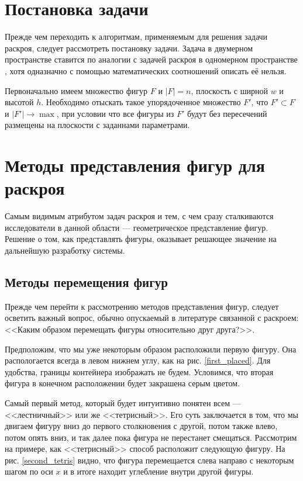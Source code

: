 \documentclass[14pt]{extarticle}
\begin{document}
	\section{Постановка задачи}
	Прежде чем переходить к алгоритмам, применяемым для решения задачи раскроя, следует рассмотреть постановку задачи. Задача в двумерном пространстве ставится по аналогии с задачей раскроя в одномерном пространстве \cite{Nikitenkov}, хотя одназначно с помощью математических соотношений описать её нельзя.
	
	Первоначально имеем множество фигур $F$ и $|F|=n$, плоскость с ширной $w$ и высотой $h$. Необходимо отыскать такое упорядоченное множество $F'$, что $F'\subset F$ и $|F'|\to \max$, при условии что все фигуры из $F'$ будут без пересечений размещены на плоскости с заданнами параметрами. 

	\section{Методы представления фигур для раскроя}
	Самым видимым атрибутом задач раскроя и тем, с чем сразу сталкиваются исследователи в данной области --- геометрическое представление фигур. Решение о том, 	как представлять фигуры, оказывает решающее значение на дальнейшую разработку системы.
	\subsection{Методы перемещения фигур}
	Прежде чем перейти к рассмотрению методов представления фигур, следует осветить важный вопрос, обычно опускаемый в литературе связанной с раскроем: <<Каким 	образом перемещать фигуры относительно друг друга?>>.


	Предположим, что мы уже некоторым образом расположили первую фигуру. Она распологается всегда в левом нижнем углу, как на рис. \ref{first_placed}. Для удобства, границы контейнера изображать не будем. Условимся, что вторая фигура в конечном расположении будет закрашена серым цветом.
	


	Самый первый метод, который будет интуитивно понятен всем --- <<лестничный>> или же	<<тетрисный>>. Его суть заключается в том, что мы двигаем фигуру вниз до первого столкновения с другой, потом также влево, потом опять вниз, и так далее пока фигура не перестанет смещаться. Рассмотрим на примере, как <<тетрисный>> способ расположит следующую фигуру. На рис. \ref{second_tetris} видно, что фигура перемещается слева направо с некоторым шагом по оси $x$ и в итоге находит углебление внутри другой фигуры.
	
\end{document}
